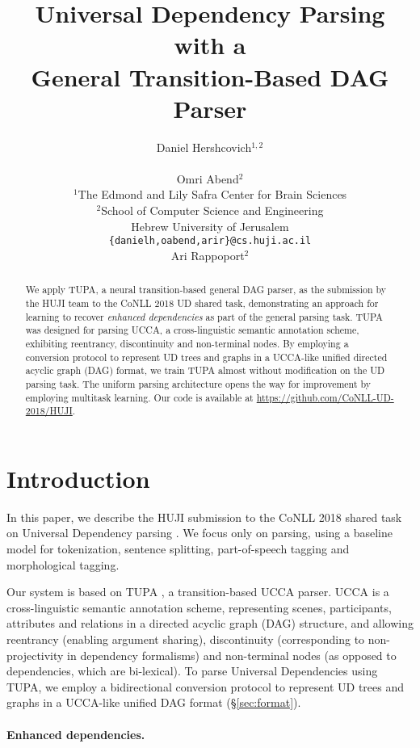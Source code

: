 \documentclass[11pt,a4paper]{article}
\title{Universal Dependency Parsing with a \\ General Transition-Based DAG Parser}
\author{Daniel Hershcovich$^{1,2}$ \\
  \\\And
  Omri Abend$^2$ \\
  $^1$The Edmond and Lily Safra Center for Brain Sciences \\
  $^2$School of Computer Science and Engineering \\
  Hebrew University of Jerusalem \\
  \texttt{\{danielh,oabend,arir\}@cs.huji.ac.il}
  \\\And
  Ari Rappoport$^2$
}
\date{}
\begin{document}
\maketitle
\begin{abstract}
  We apply TUPA, a neural transition-based general DAG parser,
  as the submission by the HUJI team to the CoNLL 2018 UD shared task,
  demonstrating an approach for learning to recover \textit{enhanced dependencies}
  as part of the general parsing task.
  TUPA was designed for parsing UCCA, a cross-linguistic
  semantic annotation scheme, exhibiting
  reentrancy, discontinuity and non-terminal nodes.
  By employing a conversion protocol to represent
  UD trees and graphs in a UCCA-like unified directed acyclic graph (DAG) format,
  we train TUPA almost without modification on the UD parsing task.
  The uniform parsing architecture opens the way for improvement by employing
  multitask learning.
  Our code is available at \url{https://github.com/CoNLL-UD-2018/HUJI}.
\end{abstract}

\section{Introduction}\label{sec:introduction}

In this paper, we describe the HUJI submission to the CoNLL 2018 shared task
on Universal Dependency parsing \cite{udst:overview2018}.
We focus only on parsing, using a baseline model \cite[UDPipe 1.2;][]{udpipe,udpipe:2017}
for tokenization, sentence splitting, part-of-speech tagging and morphological tagging.

Our system is based on TUPA \cite[see \S\ref{sec:model}]{hershcovich2017a,hershcovich2018multitask},
a transition-based UCCA parser.
UCCA \cite[Universal Conceptual Cognitive Annotation;][]{abend2013universal} is a
cross-linguistic semantic annotation scheme, representing scenes, participants,
attributes and relations in a directed acyclic graph (DAG) structure,
and allowing reentrancy (enabling argument sharing),
discontinuity (corresponding to non-projectivity in dependency formalisms)
and non-terminal nodes (as opposed to dependencies, which are bi-lexical).
To parse Universal Dependencies \cite{nivre2016universal}
using TUPA, we employ a bidirectional conversion protocol to represent
UD trees and graphs in a UCCA-like unified DAG format (\S\ref{sec:format}).

\paragraph{Enhanced dependencies.}
\end{document}
